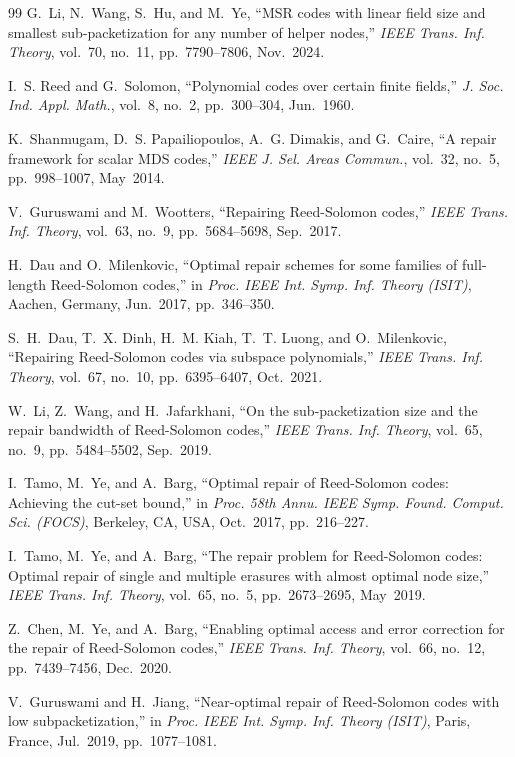 \documentclass[11pt,onecolumn]{IEEEtran}
\begin{document}
\begin{thebibliography}{99}
G.~Li, N.~Wang, S.~Hu, and M.~Ye,
``MSR codes with linear field size and smallest sub-packetization for any number of helper nodes,''
\emph{IEEE Trans. Inf. Theory}, vol.~70, no.~11, pp.~7790--7806, Nov.~2024.

I.~S. Reed and G.~Solomon,
``Polynomial codes over certain finite fields,''
\emph{J. Soc. Ind. Appl. Math.}, vol.~8, no.~2, pp.~300--304, Jun.~1960.

K.~Shanmugam, D.~S. Papailiopoulos, A.~G. Dimakis, and G.~Caire,
``A repair framework for scalar MDS codes,''
\emph{IEEE J. Sel. Areas Commun.}, vol.~32, no.~5, pp.~998--1007, May~2014.

V.~Guruswami and M.~Wootters,
``Repairing Reed-Solomon codes,''
\emph{IEEE Trans. Inf. Theory}, vol.~63, no.~9, pp.~5684--5698, Sep.~2017.

H.~Dau and O.~Milenkovic,
``Optimal repair schemes for some families of full-length Reed-Solomon codes,''
in \emph{Proc. IEEE Int. Symp. Inf. Theory (ISIT)}, Aachen, Germany,
Jun.~2017, pp.~346--350.

S.~H.~Dau, T.~X. Dinh, H.~M. Kiah, T.~T. Luong, and O.~Milenkovic,
``Repairing Reed-Solomon codes via subspace polynomials,''
\emph{IEEE Trans. Inf. Theory}, vol.~67, no.~10, pp.~6395--6407, Oct.~2021.

W.~Li, Z.~Wang, and H.~Jafarkhani,
``On the sub-packetization size and the repair bandwidth of Reed-Solomon codes,''
\emph{IEEE Trans. Inf. Theory}, vol.~65, no.~9, pp.~5484--5502, Sep.~2019.

I.~Tamo, M.~Ye, and A.~Barg,
``Optimal repair of Reed-Solomon codes: Achieving the cut-set bound,''
in \emph{Proc. 58th Annu. IEEE Symp. Found. Comput. Sci. (FOCS)},
Berkeley, CA, USA, Oct.~2017, pp.~216--227.

I.~Tamo, M.~Ye, and A.~Barg,
``The repair problem for Reed-Solomon codes: Optimal repair of single and multiple erasures with almost optimal node size,''
\emph{IEEE Trans. Inf. Theory}, vol.~65, no.~5, pp.~2673--2695, May~2019.

Z.~Chen, M.~Ye, and A.~Barg,
``Enabling optimal access and error correction for the repair of Reed-Solomon codes,''
\emph{IEEE Trans. Inf. Theory}, vol.~66, no.~12, pp.~7439--7456, Dec.~2020.

V.~Guruswami and H.~Jiang,
``Near-optimal repair of Reed-Solomon codes with low subpacketization,''
in \emph{Proc. IEEE Int. Symp. Inf. Theory (ISIT)}, Paris, France, Jul.~2019, pp.~1077--1081.


\end{thebibliography}
\end{document}
